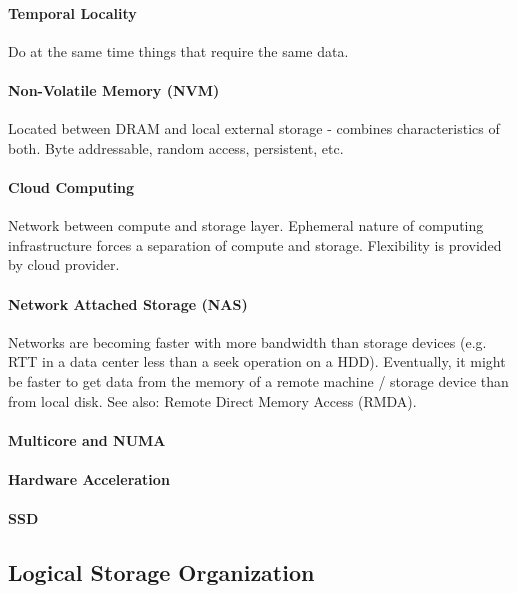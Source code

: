 \paragraph{Temporal Locality}
Do at the same time things that require the same data.

\paragraph{Non-Volatile Memory (NVM)}
Located between DRAM and local external storage - combines characteristics of both. Byte addressable, random access, persistent, etc.

\paragraph{Cloud Computing}
Network between compute and storage layer. Ephemeral nature of computing infrastructure forces a separation of compute and storage. Flexibility is provided by cloud provider.

\paragraph{Network Attached Storage (NAS)}
Networks are becoming faster with more bandwidth than storage devices (e.g. RTT in a data center less than a seek operation on a HDD). Eventually, it might be faster to get data from the memory of a remote machine / storage device than from local disk. See also: Remote Direct Memory Access (RMDA).

\paragraph{Multicore and NUMA}

\paragraph{Hardware Acceleration}

\paragraph{SSD}






\subsection{Logical Storage Organization}

